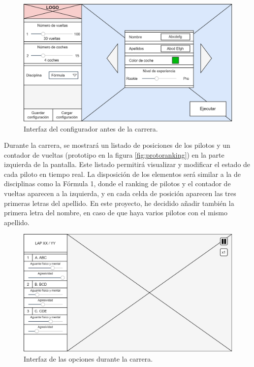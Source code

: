 \begin{figure}[H]
    \centering
    \includegraphics[width=\textwidth]{imagenes/pag1.png}
    \caption{Interfaz del configurador antes de la carrera.}
\end{figure}

Durante la carrera, se mostrará un listado de posiciones de los pilotos y un contador de vueltas (prototipo en la figura \ref{fig:protoranking}) en la parte izquierda de la pantalla. Este listado permitirá visualizar y modificar el estado de cada piloto en tiempo real. La disposición de los elementos será similar a la de disciplinas como la Fórmula 1, donde el ranking de pilotos y el contador de vueltas aparecen a la izquierda, y en cada celda de posición aparecen las tres primeras letras del apellido. En este proyecto, he decidido añadir también la primera letra del nombre, en caso de que haya varios pilotos con el mismo apellido.


\begin{figure}[H]
    \centering
    \includegraphics[width=\textwidth]{imagenes/pag2.png}
    \caption{Interfaz de las opciones durante la carrera.}
\end{figure}

